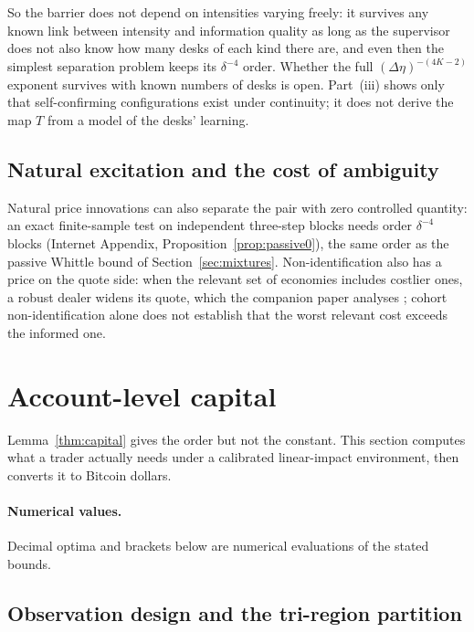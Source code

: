 \documentclass[12pt]{article}
\theoremstyle{definition}
\theoremstyle{remark}
\begin{document}
So the barrier does not depend on intensities varying freely: it survives any known link between intensity and information quality as long as the supervisor does not also know how many desks of each kind there are, and even then the simplest separation problem keeps its $\delta^{-4}$ order. Whether the full $(\Delta\eta)^{-(4K-2)}$ exponent survives with known numbers of desks is open. Part~(iii) shows only that self-confirming configurations exist under continuity; it does not derive the map $T$ from a model of the desks' learning.

\subsection{Natural excitation and the cost of ambiguity}

Natural price innovations can also separate the pair with zero controlled quantity: an exact finite-sample test on independent three-step blocks needs order $\delta^{-4}$ blocks (Internet Appendix, Proposition~\ref{prop:passive0}), the same order as the passive Whittle bound of Section~\ref{sec:mixtures}. Non-identification also has a price on the quote side: when the relevant set of economies includes costlier ones, a robust dealer widens its quote, which the companion paper analyses \citep{niroula2026b}; cohort non-identification alone does not establish that the worst relevant cost exceeds the informed one.
\section{Account-level capital}\label{sec:account}

Lemma~\ref{thm:capital} gives the order but not the constant. This section computes what a trader actually needs under a calibrated linear-impact environment, then converts it to Bitcoin dollars.

\paragraph{Numerical values.} Decimal optima and brackets below are numerical evaluations of the stated bounds.

\subsection{Observation design and the tri-region partition}
\end{document}
